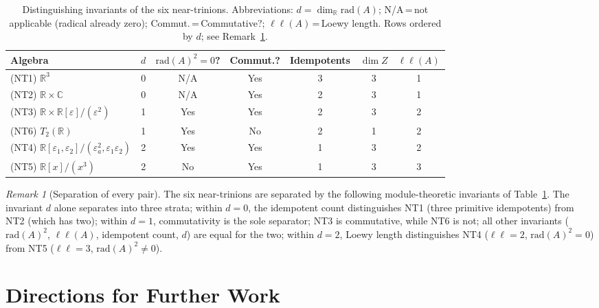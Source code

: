 \documentclass{amsart}
\theoremstyle{plain}
\theoremstyle{definition}
\theoremstyle{remark}
\newtheorem{remark}[theorem]{Remark}
\newcommand{\RR}{\mathbb{R}}
\newcommand{\CC}{\mathbb{C}}
\newcommand{\Jac}{\mathrm{rad}}
\newcommand{\LL}{\ell\ell}
\begin{document}
\begin{table}[h]
\caption{Distinguishing invariants of the six near-trinions.
Abbreviations: $d = \dim_\RR \Jac(A)$; N/A\,=\,not applicable
(radical already zero); Commut.\,=\,Commutative?;
$\LL(A)$\,=\,Loewy length.
Rows ordered by $d$; see Remark~\ref{rem:separation}.}
\label{tab:invariants}
\renewcommand{\arraystretch}{1.35}
\begin{tabular}{lcccccc}
  \toprule
  Algebra & $d$ & $\Jac(A)^2{=}0$? & Commut.? & Idempotents & $\dim Z$ & $\LL(A)$  \\
  \midrule
  \textup{(NT1)} $\RR^3$
    & 0 & N/A & Yes & 3 & 3 & 1 \\
  \textup{(NT2)} $\RR \times \CC$
    & 0 & N/A & Yes & 2 & 3 & 1 \\
  \textup{(NT3)} $\RR \times \RR[\varepsilon]/(\varepsilon^2)$
    & 1 & Yes & Yes & 2 & 3 & 2 \\
  \textup{(NT6)} $T_2(\RR)$
    & 1 & Yes & No  & 2 & 1 & 2 \\
  \textup{(NT4)} $\RR[\varepsilon_1,\varepsilon_2]/(\varepsilon_a^2, \varepsilon_1 \varepsilon_2)$
    & 2 & Yes & Yes & 1 & 3 & 2 \\
  \textup{(NT5)} $\RR[x]/(x^3)$
    & 2 & No  & Yes & 1 & 3 & 3 \\
  \bottomrule
\end{tabular}
\end{table}

\begin{remark}[Separation of every pair]\label{rem:separation}
The six near-trinions are separated by the following module-theoretic invariants of Table~\ref{tab:invariants}. The invariant $d$ alone separates into three strata; within $d=0$, the idempotent count distinguishes NT1 (three primitive idempotents) from NT2 (which has two); within $d=1$, commutativity is the sole separator;
      NT3 is commutative, while NT6 is not; all other invariants
      ($\Jac(A)^2$, $\LL(A)$, idempotent count, $d$) are equal for the two; within $d=2$, Loewy length distinguishes NT4
      ($\LL = 2$, $\Jac(A)^2 = 0$) from NT5 ($\LL = 3$, $\Jac(A)^2 \neq 0$).
\end{remark}

\section{Directions for Further Work}\label{sec:future}
\end{document}
